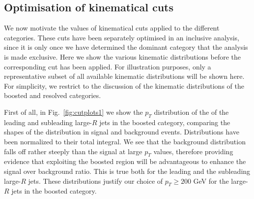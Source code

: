 \subsection{Optimisation of kinematical cuts}

We now motivate the values of
kinematical cuts applied to the different categories.
%
These cuts have been separately
optimised in an inclusive analysis, since it is only
once we have determined
the dominant category that the analysis is made exclusive.
%
Here we show the various kinematic distributions 
before the corresponding cut has been applied.
%
For illustration purposes,
only a representative subset of
all available kinematic distributions will be shown here.
%
For simplicity,
we restrict to the discussion of the
kinematic distributions of the boosted
and resolved categories.


First of all,
in Fig.~\ref{fig:cutplots1} we show
the $p_T$ distribution of the 
of the
  leading and subleading large-$R$ jets in the boosted category, comparing
  the shapes of the distribution in signal and background events.
  Distributions have been normalized to their total integral.
  We see that the background distribution
  falls off rather steeply than the signal at large $p_T$
  values, therefore
  providing evidence that exploiting the boosted region will be
  advantageous to enhance the signal over background ratio.
  This is true both for the leading and the subleading
  large-$R$ jets.
  These distributions justify our choice of $p_T \ge 200$ GeV
  for the large-$R$ jets in the boosted category.
  

